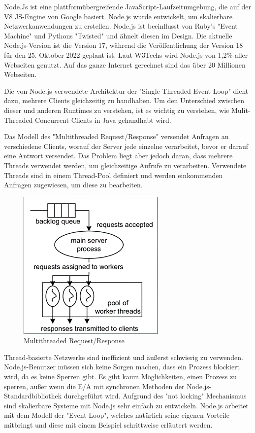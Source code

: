 Node.Js ist eine plattformübergreifende JavaScript-Laufzeitumgebung, die auf der V8 JS-Engine von Google basiert. Node.js wurde entwickelt, um skalierbare Netzwerkanwendungen zu erstellen. Node.js ist beeinflusst von Ruby's "Event Machine" und Pythons "Twisted" und ähnelt diesen im Design. Die aktuelle Node.js-Version ist die Version 17, während die Veröffentlichung der Version 18 für den 25. Oktober 2022 geplant ist. Laut W3Techs wird Node.js von 1,2\% aller Webseiten genutzt. Auf das ganze Internet gerechnet sind das über 20 Millionen Webseiten. \cite{Node}

Die von Node.js verwendete Architektur der "Single Threaded Event Loop" dient dazu, mehrere Clients gleichzeitig zu handhaben. Um den Unterschied zwischen dieser und anderen Runtimes zu verstehen, ist es wichtig zu verstehen, wie Mulit-Threaded Concurrent Clients in Java gehandhabt wird. \cite{NodeJs.dev}


Das Modell des "Multithreaded Request/Response" versendet Anfragen an verschiedene Clients, worauf der Server jede einzelne verarbeitet, bevor er darauf eine Antwort versendet. Das Problem liegt aber jedoch daran, dass mehrere Threads verwendet werden, um gleichzeitige Aufrufe zu verarbeiten. Verwendete Threads sind in einem Thread-Pool definiert und werden einkommenden Anfragen zugewiesen, um diese zu bearbeiten. \cite{Arocom}



\begin{figure}[H]
    \centering
    \includegraphics{media/NodeJs/MultiThreadedRequestResponse.png}
    \caption{Multithreaded Request/Response\cite{Multithreaded}}
\end{figure}

Thread-basierte Netzwerke sind ineffizient und äußerst schwierig zu verwenden. Node.js-Benutzer müssen sich keine Sorgen machen, dass ein Prozess blockiert wird, da es keine Sperren gibt. Es gibt kaum Möglichkeiten, einen Prozess zu sperren, außer wenn die E/A mit synchronen Methoden der Node.js-Standardbibliothek durchgeführt wird. Aufgrund des "not locking" Mechanismus sind skalierbare Systeme mit Node.js sehr einfach zu entwickeln. 
Node.js arbeitet mit dem Modell der "Event Loop", welches natürlich seine eigenen Vorteile mitbringt und diese mit einem Beispiel schrittweise erläutert werden.


